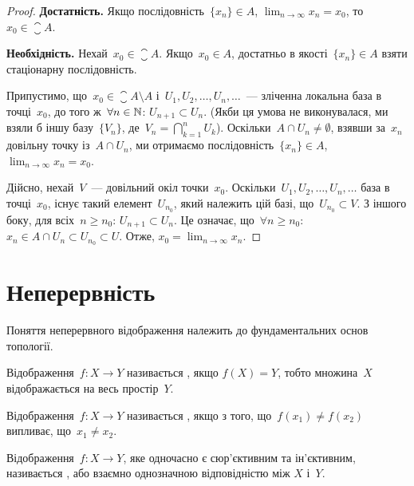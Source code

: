 \begin{proof}
    \textbf{Достатність.} Якщо %
    послідовність~$\{x_n\} \in A$, $\lim_{n \to \infty} x_n = x_0$, то~$x_0 \in \closure{A}$.

    \textbf{Необхідність.} Нехай~$x_0 \in \closure{A}$. Якщо~$x_0 \in A$, достатньо в якості~$\{x_n\} \in A$ взяти стаціонарну послідовність.

    Припустимо, що~$x_0 \in \closure{A} \setminus A$ і~$U_1, U_2, \ldots, U_n, \ldots$~--- зліченна локальна база в точці~$x_0$, до того ж~$\forall n \in \mathbb{N}$: $U_{n + 1} \subset U_n$. (Якби ця умова не виконувалася, ми взяли б іншу базу~$\{V_n\}$, де~$V_n = \bigcap_{k = 1}^n U_k$). Оскільки~$A \cap U_n \ne \emptyset$, взявши за~$x_n$ довільну точку із~$A \cap U_n$, ми отримаємо послідовність~$\{x_n\} \in A$, $\lim_{n \to \infty} x_n = x_0$.

    Дійсно, нехай~$V$~--- довільний окіл точки~$x_0$. Оскільки~$U_1, U_2, \ldots, U_n, \ldots$ база в точці~$x_0$, існує такий елемент~$U_{n_0}$, який належить цій базі, що~$U_{n_0} \subset V$. З іншого боку, для всіх~$n \ge n_0$: $U_{n + 1} \subset U_n$. Це означає, що~$\forall n \ge n_0$: $x_n \in A \cap U_n \subset U_{n_0} \subset U$. Отже, $x_0 = \lim_{n \to \infty} x_n$.
\end{proof}

\section{Неперервність}

Поняття неперервного відображення належить до фундаментальних основ топології.

\begin{definition}
    Відображення~$f: X \to Y$ називається , якщо $f(X) = Y$, тобто множина~$X$ відображається на весь простір~$Y$.
\end{definition}

\begin{definition}
    Відображення~$f: X \to Y$ називається , якщо з того, що~$f(x_1) \ne f(x_2)$ випливає, що~$x_1 \ne x_2$.
\end{definition}

\begin{definition}
    Відображення~$f: X \to Y$, яке одночасно є сюр'єктивним та ін'єктивним, називається , або взаємно однозначною відповідністю між $X$ і~$Y$.
\end{definition}

